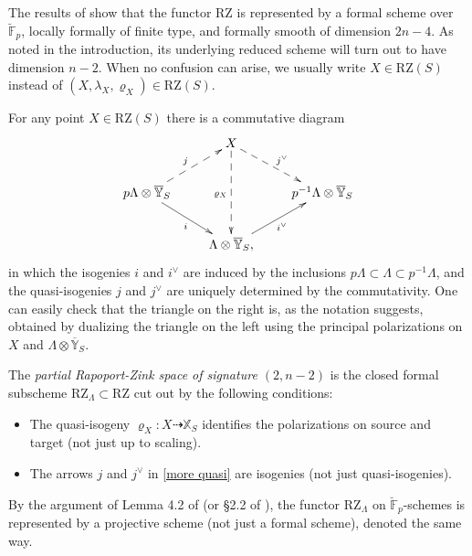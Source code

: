 \documentclass[11pt]{alggeom}
\newcommand{\F}{\mathbb F}
\begin{document}
The results of \cite{RZbook} show that the functor $\mathrm{RZ}$ is represented by a formal scheme over $\breve{\F}_p$,  locally formally of finite type, and formally smooth of dimension $2n-4$.
As noted in the introduction, its underlying reduced scheme will turn out to have dimension $n-2$.
When no confusion can arise, we usually write $X \in \mathrm{RZ}(S)$ instead of $(X,\lambda_X,\varrho_X)\in \mathrm{RZ}(S)$.









For any point $X \in \mathrm{RZ}(S)$ there is a commutative diagram 
\begin{equation}\label{more quasi}
\xymatrix{
&   {  X  }  \ar@{-->}[rd]^{j^\vee}  \ar@{-->}[dd]_{\varrho_X} \\
{p\Lambda \otimes \overline{\mathbb{Y}}_S  } \ar@{-->}[ur]^{ j } \ar[dr]_i  & &  {p^{-1}\Lambda \otimes \overline{\mathbb{Y}}_S  }  \\
 &  { \Lambda \otimes \overline{\mathbb{Y} }_S   }  \ar[ur]_{i^\vee},
}
\end{equation}
in which the isogenies  $i$ and $i^\vee$ are induced by the inclusions $p\Lambda \subset \Lambda \subset p^{-1}\Lambda$, and the quasi-isogenies  $j$ and $j^\vee$ are uniquely determined by the commutativity.  
One can easily check that the triangle on the right is, as the notation suggests, obtained by dualizing the triangle on the left  using the principal polarizations on $X$ and $\Lambda \otimes \overline{\mathbb{Y}}_S$.






\begin{definition}\label{def:partialRZ}
The \emph{partial Rapoport-Zink space of signature $(2,n-2)$}  is the closed formal subscheme $\mathrm{RZ}_\Lambda \subset \mathrm{RZ}$ cut out by the following conditions:
\begin{itemize}
\item
The quasi-isogeny $\varrho_X :  X \dashrightarrow    \mathbb{X}_S$ identifies the polarizations on source and target (not just up to scaling).
\item
The arrows $j$ and $j^\vee$ in \eqref{more quasi} are isogenies (not just quasi-isogenies).
\end{itemize} 
\end{definition}



\begin{remark}\label{rem:projectivity}
By the argument of Lemma 4.2 of  \cite{VollaardWedhorn}  (or \S 2.2 of \cite{RZbook}), the functor $\mathrm{RZ}_\Lambda$ on $\breve{\F}_p$-schemes is represented by a  projective scheme (not just a formal scheme), denoted the same way.
\end{remark}
\end{document}
